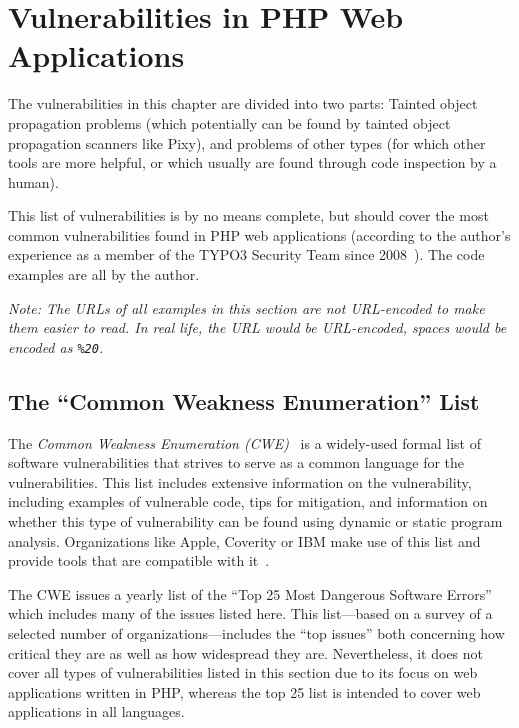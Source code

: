 \chapter{Vulnerabilities in PHP Web Applications}
\label{vulnerabilities}

The vulnerabilities in this chapter are divided into two parts: Tainted object propagation problems (which potentially can be found by tainted object propagation scanners like Pixy), and problems of other types (for which other tools are more helpful, or which usually are found through code inspection by a human).

This list of vulnerabilities is by no means complete, but should cover the most common vulnerabilities found in PHP web applications (according to the author's experience as a member of the TYPO3 Security Team since 2008~\cite{security-team-members}). The code examples are all by the author.

\emph{Note: The URLs of all examples in this section are not URL-encoded to make them easier to read. In real life, the URL would be URL-encoded, \eg spaces would be encoded as \texttt{\%20}.}

\section{The ``Common Weakness Enumeration'' List}
The \emph{Common Weakness Enumeration (CWE)}~\cite{cwe} is a widely-used formal list of software vulnerabilities that strives to serve as a common language for the vulnerabilities. This list includes extensive information on the vulnerability, including examples of vulnerable code, tips for mitigation, and information on whether this type of vulnerability can be found using dynamic or static program analysis. Organizations like Apple, Coverity or IBM make use of this list and provide tools that are compatible with it~\cite{cwe-organizations}.

The CWE issues a yearly list of the ``Top 25 Most Dangerous Software Errors''~\cite{cwe-top-25} which includes many of the issues listed here. This list---based on a survey of a selected number of organizations---includes the ``top issues'' both concerning how critical they are as well as how widespread they are. Nevertheless, it does not cover all types of vulnerabilities listed in this section due to its focus on web applications written in PHP, whereas the top 25 list is intended to cover web applications in all languages.

